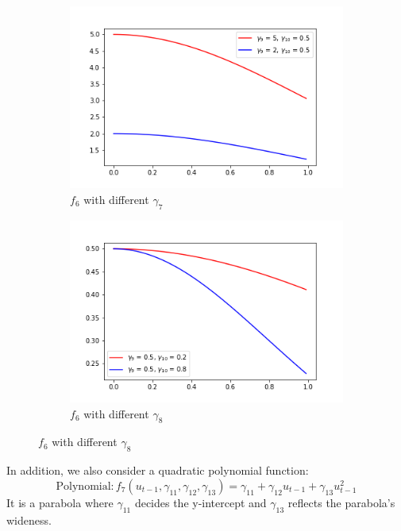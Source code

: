 \documentclass[a4paper,12pt,times,numbered,print,index]{report}
\numberwithin{equation}{section}
\begin{document}
\begin{figure}[!htbp]
	\centering
	\caption{$f_{6}\left(x_{t-1}^{\prime }\theta _{0},\gamma_{0}\right)$ with different $\gamma$}
	\begin{subfigure}[b]{0.44\linewidth}
		\includegraphics[width=\linewidth]{plots/scale_exp_g9.png}
		\caption{$f_{6}$ with different $\gamma_{7}$}
		\label{param_g9}
	\end{subfigure}
	\begin{subfigure}[b]{0.44\linewidth}
		\includegraphics[width=\linewidth]{plots/scale_exp_g10.png}
		\caption{$f_{6}$ with different $\gamma_{8}$}
		\label{param_g10}
	\end{subfigure}
	\label{exp2}
\end{figure}

In addition, we also consider a quadratic polynomial function:
$$
\text{Polynomial}: f_{7}\left( u_{t-1},\gamma_{11}, \gamma_{12}, \gamma_{13}\right) = \gamma_{11}+ \gamma_{12}u_{t-1}+\gamma_{13}u_{t-1}^{2}
$$
It is a parabola where $\gamma_{11}$ decides the y-intercept and $\gamma_{13}$ reflects the parabola's wideness.
\end{document}
